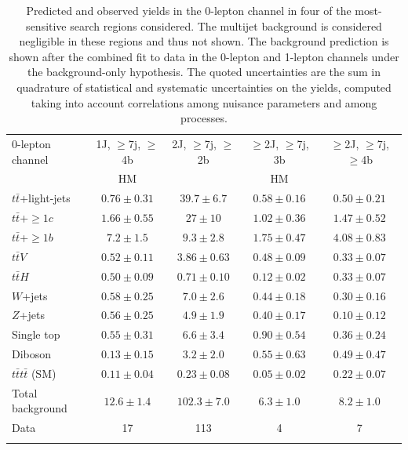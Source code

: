\begin{table}[htb!]
\begin{center}
\begin{tabular}{l*{4}{c}}
\toprule\toprule
0-lepton channel & 1J, $\geq$7j, $\geq$4b & 2J, $\geq$7j, $\geq$2b & $\geq$2J, $\geq$7j, 3b & $\geq$2J, $\geq$7j, $\geq$4b  \\
& HM & & HM & \\
\midrule\midrule
$t\bar{t}$+light-jets & $ 0.76 \pm 0.31 $ &   $ 39.7 \pm 6.7 $ &   $ 0.58 \pm 0.16 $ &   $ 0.50 \pm 0.21 $ \\ 
$t\bar{t}$+$\geq$$1c$ & $ 1.66 \pm 0.55 $ &   $ 27 \pm 10 $ &   $ 1.02 \pm 0.36 $ &   $ 1.47 \pm 0.52 $ \\  
$t\bar{t}$+$\geq$$1b$ & $ 7.2 \pm 1.5 $ &   $ 9.3 \pm 2.8 $ &   $ 1.75 \pm 0.47 $ &   $ 4.08 \pm 0.83 $ \\
$t\bar{t}V$ & $ 0.52 \pm 0.11 $ &   $ 3.86 \pm 0.63 $ &   $ 0.48 \pm 0.09 $ &   $ 0.33 \pm 0.07 $ \\  
$t\bar{t}H$ & $ 0.50 \pm 0.09 $ &   $ 0.71 \pm 0.10 $ &   $ 0.12 \pm 0.02 $ &   $ 0.33 \pm 0.07 $ \\
$W$+jets & $ 0.58 \pm 0.25 $ &   $ 7.0 \pm 2.6 $ &   $ 0.44 \pm 0.18 $ &   $ 0.30 \pm 0.16 $ \\
$Z$+jets & $ 0.56 \pm 0.25 $ &   $ 4.9 \pm 1.9 $ &   $ 0.40 \pm 0.17 $ &   $ 0.10 \pm 0.12 $ \\
Single top & $ 0.55 \pm 0.31 $ &   $ 6.6 \pm 3.4 $ &   $ 0.90 \pm 0.54 $ &   $ 0.36 \pm 0.24 $ \\ 
Diboson & $ 0.13 \pm 0.15 $ &   $ 3.2 \pm 2.0 $ &   $ 0.55 \pm 0.63 $ &   $ 0.49 \pm 0.47 $ \\ 
$t\bar{t}t\bar{t}$ (SM) &  $ 0.11 \pm 0.04 $ &   $ 0.23 \pm 0.08 $ &   $ 0.05 \pm 0.02 $ &   $ 0.22 \pm 0.07 $ \\  
\midrule
Total background & $ 12.6 \pm 1.4 $ &   $ 102.3 \pm 7.0 $ &   $ 6.3 \pm 1.0 $ &   $ 8.2 \pm 1.0 $ \\ 
\midrule
Data &  17  & 113  & 4  & 7  \\ 
\bottomrule\bottomrule     \\
\end{tabular}
\vspace{0.1cm}

%
\end{center}
\vspace{-0.5cm}
\captionsetup{width=0.85\textwidth} \caption{\small Predicted and observed yields in the 0-lepton channel in four of the most-sensitive search regions considered. The multijet background is considered negligible in these regions and thus not shown. The background prediction is shown after the combined fit to data in the 0-lepton and 1-lepton channels under the background-only hypothesis. The quoted uncertainties are the sum in quadrature of statistical and systematic uncertainties on the yields, computed taking into account correlations among nuisance parameters and among processes. }
\label{chp:vlq:tab:Postfit_Yields_0L_unblind_COMB}
\end{table}
